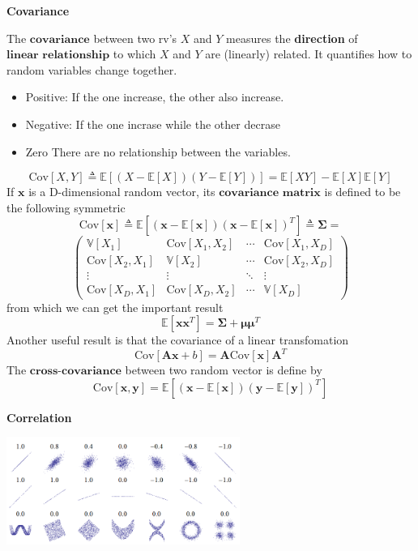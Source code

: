 \documentclass[10pt,landscape]{article}
\newcommand{\cov}{\textrm{Cov}}
\newcommand{\mean}{\mathbb{E}}
\newcommand{\var}{\mathbb{V}}
\newcommand{\inp}{\textbf{x}}
\newcommand{\out}{\textbf{y}}
\newcommand{\Cov}{\mathbf{\Sigma}}
\newcommand{\Mean}{\boldsymbol{\mu}}
\begin{document}
\begin{multicols*}{3}
\textbf{Covariance}

The $\textbf{covariance}$ between two rv's $X$ and $Y$ measures the \textbf{direction} of $\textbf{linear relationship}$ to which $X$ and $Y$ are (linearly) related. It quantifies how to random variables change together.
\begin{itemize}
    \item Positive: If the one increase, the other also increase.
    \item Negative: If the one incrase while the other decrase
    \item Zero There are no relationship between the variables. 
\end{itemize}

\[
    \cov[X,Y]\triangleq\mean[(X-\mean[X])(Y-\mean[Y])]=\mean[XY]-\mean[X]\mean[Y]
\]
If $\inp$ is a D-dimensional random vector, its $\textbf{covariance matrix}$ is defined to be the following symmetric
\[
    \cov[\inp]\triangleq\mean[(\inp-\mean[\inp])(\inp-\mean[\inp])^T] \triangleq \boldsymbol{\Cov} = 
\]
\[
    \begin{pmatrix}
        \var[X_1] & \cov[X_1,X_2] & \cdots & \cov[X_1,X_D] \\
        \cov[X_2,X_1] & \var[X_2] & \cdots &\cov[X_2,X_D] \\
        \vdots & \vdots & \ddots & \vdots \\ 
        \cov[X_D,X_1] & \cov[X_D,X_2] & \cdots & \var[X_D]
    \end{pmatrix}
\]
from which we can get the important result
\[
    \mean[\inp\inp^T] = \Cov +\Mean\Mean^T
\]
Another useful result is that the covariance of a linear transfomation
\[
    \cov[\mathbf{A}\inp+b]=\mathbf{A}\cov[\inp]\mathbf{A}^T
\]
The $\textbf{cross-covariance}$ between two random vector is define by
\[
    \cov[\inp,\out]=\mean[(\inp-\mean[\inp])(\out-\mean[\out])^T]
\]

\textbf{Correlation}

\begin{minipage}{\linewidth}
    \centering
    \includegraphics[width=3in]{figures/correlation.PNG}
\end{minipage}


\end{multicols*}
\end{document}
